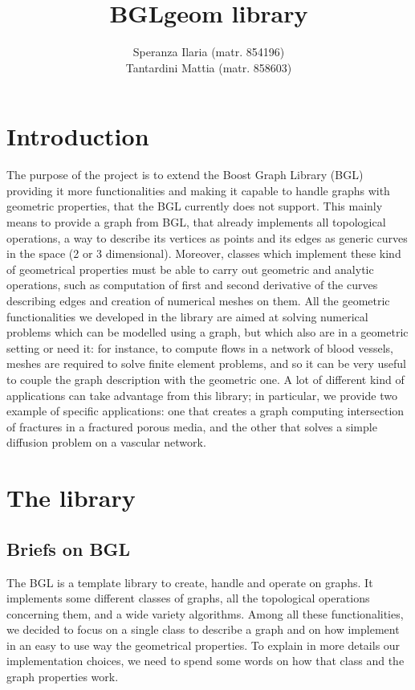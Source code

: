 \documentclass[11pt]{article} %
\title{BGLgeom library}
\author{Speranza Ilaria (matr. 854196) \\ Tantardini Mattia (matr. 858603)}
\begin{document}
\maketitle
\newpage
\tableofcontents
\newpage

\section{Introduction}
	The purpose of the project is to extend the Boost Graph Library (BGL) providing it more functionalities and making it capable to handle graphs with geometric properties, that the BGL currently does not support. This mainly means to provide a graph from BGL, that already implements all topological operations, a way to describe its vertices as points and its edges as generic curves in the space (2 or 3 dimensional). Moreover, classes which implement these kind of geometrical properties must be able to carry out geometric and analytic operations, such as computation of first and second derivative of the curves describing edges and creation of numerical meshes on them. \newline
	All the geometric functionalities we developed in the library are aimed at solving numerical problems which can be modelled using a graph, but which also are in a geometric setting or need it: for instance, to compute flows in a network of blood vessels, meshes are required to solve finite element problems, and so it can be very useful to couple the graph description with the geometric one. \newline
	A lot of different kind of applications can take advantage from this library; in particular, we provide two example of specific applications: one that creates a graph computing intersection of fractures in a fractured porous media, and the other that solves a simple diffusion problem on a vascular network.

\section{The library}
	\subsection{Briefs on BGL}
	The BGL is a template library to create, handle and operate on graphs. It implements some different classes of graphs, all the topological operations concerning them, and a wide variety algorithms.
	\newline\newline
	Among all these functionalities, we decided to focus on a single class to describe a graph and on how implement in an easy to use way the geometrical properties. To explain in more details our implementation choices, we need to spend some words on how that class and the graph properties work.
	
\end{document}
